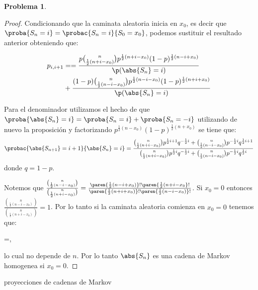 \documentclass[a5paper,oneside]{amsart}
\theoremstyle{plain}
\theoremstyle{definition}
\newtheorem{problema}{Problema}
\begin{document}
\begin{problema}
\begin{enumerate}
\begin{proof}
Condicionando que la caminata aleatoria inicia en $x_0$, es decir que $\proba{S_n=i}=\probac{S_n=i}{S_0=x_0}$, podemos sustituir el resultado anterior obteniendo que:

\begin{align}
p_{i,i+1}&==\frac{p{n \choose \frac{1}{2}(n+i-x_0)} p^{\frac{1}{2}(n+i-x_0)} (1-p)^{\frac{1}{2}(n-i+x_0)}}{\p(\abs{S_{n}}=i)} \notag \\
&+ \frac{(1-p){n \choose \frac{1}{2}(n-i-x_0) }p^{\frac{1}{2}(n-i-x_0)} (1-p)^{\frac{1}{2}(n+i+x_0)}}{\p(\abs{S_{n}}=i)} \notag
\end{align}

Para el denominador utilizamos el hecho de que  $\proba{\abs{S_{n}}=i}=\proba{S_n=i}+\proba{S_n=-i}$  utilizando de nuevo la proposici\'on y factorizando  $p^{\frac{1}{2}(n-x_0)}(1-p)^{\frac{1}{2}(n+x_0)} $ se tiene que:
\begin{align}
\probac{\abs{S_{n+1}}=i+1}{\abs{S_{n}}=i}=\frac{{n \choose \frac{1}{2}(n+i-x_0)} p^{\frac{1}{2}i+1} q^{-\frac{1}{2}i} + {n \choose \frac{1}{2}(n-i-x_0)}p^{-\frac{1}{2}i} q^{\frac{1}{2}i+1}}{ {n \choose \frac{1}{2}(n+i-x_0)} p^{\frac{1}{2}i} q^{-\frac{1}{2}i}+{n \choose \frac{1}{2}(n-i-x_0)} p^{-\frac{1}{2}i} q^{\frac{1}{2}i}} \notag
\end{align}
donde $q=1-p$.

Notemos que 
$\frac{{n \choose \frac{1}{2}(n-i-x_0)}}{{n \choose \frac{1}{2}(n+i-x_0)}}  =\frac{\paren{\frac{1}{2}(n-i+x_0)}!\paren{\frac{1}{2}(n+i-x_0}!}{\paren{\frac{1}{2}(n+i+x_0)}!\paren{\frac{1}{2}(n-i-x_0)}!}$. Si $x_0=0$ entonces $\frac{{n \choose \frac{1}{2}(n-i-x_0)}}{{n \choose \frac{1}{2}(n+i-x_0)}}=1$. Por lo tanto si la caminata aleatoria comienza en $x_0=0$ tenemos que:
\begin{esn}
=,
\end{esn}
lo cual no depende de $n$. Por lo tanto $\abs{S_n}$ es una cadena de Markov homogenea si $x_0=0$.

\end{proof}

\end{enumerate}

 proyecciones de cadenas de Markov
\end{problema}
\end{document}
